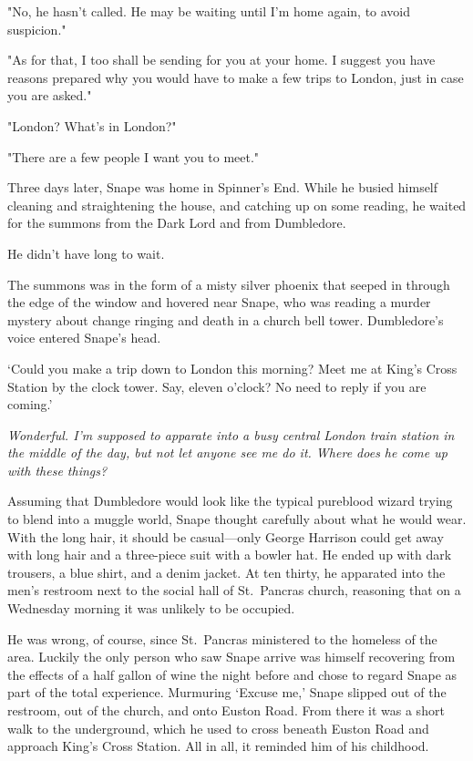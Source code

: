 "No, he hasn't called. He may be waiting until I'm home again, to avoid suspicion."

"As for that, I too shall be sending for you at your home. I suggest you have reasons prepared why you would have to make a few trips to London, just in case you are asked."

"London? What's in London?"

"There are a few people I want you to meet."

Three days later, Snape was home in Spinner's End. While he busied himself cleaning and straightening the house, and catching up on some reading, he waited for the summons from the Dark Lord and from Dumbledore.

He didn't have long to wait.

The summons was in the form of a misty silver phoenix that seeped in through the edge of the window and hovered near Snape, who was reading a murder mystery about change ringing and death in a church bell tower. Dumbledore's voice entered Snape's head.

`Could you make a trip down to London this morning? Meet me at King's Cross Station by the clock tower. Say, eleven o'clock? No need to reply if you are coming.'

\emph{Wonderful. I'm supposed to apparate into a busy central London train station in the middle of the day, but not let anyone see me do it. Where does he come up with these things?}

Assuming that Dumbledore would look like the typical pureblood wizard trying to blend into a muggle world, Snape thought carefully about what he would wear. With the long hair, it should be casual—only George Harrison could get away with long hair and a three-piece suit with a bowler hat. He ended up with dark trousers, a blue shirt, and a denim jacket. At ten thirty, he apparated into the men's restroom next to the social hall of St.~Pancras church, reasoning that on a Wednesday morning it was unlikely to be occupied.

He was wrong, of course, since St.~Pancras ministered to the homeless of the area. Luckily the only person who saw Snape arrive was himself recovering from the effects of a half gallon of wine the night before and chose to regard Snape as part of the total experience. Murmuring `Excuse me,' Snape slipped out of the restroom, out of the church, and onto Euston Road. From there it was a short walk to the underground, which he used to cross beneath Euston Road and approach King's Cross Station. All in all, it reminded him of his childhood.

